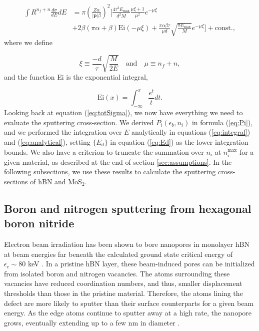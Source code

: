 \documentclass{article}
\begin{document}
\begin{equation}
  \begin{aligned}
    \int R^{n_f+n} \frac{d\sigma}{dE} dE
    &=
    \pi\left(\frac{Z\alpha}{|\mathbf{p}|\beta}\right)^2
    \bigg[
      \frac{4\tau^2 E_\text{max}}{d^2M} \frac{\mu\xi+1}{\mu^2} e^{-\mu\xi}
      \\&+
      2\beta(\pi\alpha+\beta)\text{Ei}(-\mu\xi)
      +
      \frac{\pi\alpha\beta\tau}{\mu d}\sqrt{\frac{8E_\text{max}}{M}}
      e^{-\mu\xi}
    \bigg]
    +\text{const}.,
  \end{aligned}
  \label{eq:analytical}
\end{equation}
%
where we define

\begin{equation}
  \xi \equiv \frac{-d}{\tau} \sqrt{\frac{M}{2E}}
  \quad\text{and}\quad
  \mu \equiv n_f + n,
  \label{eq:xi}
\end{equation}
%
and the function Ei is the exponential integral,

\begin{equation}
  \text{Ei}(x) = \int_{-\infty}^x \frac{e^t}{t}dt.
  \label{eq:Ei}
\end{equation}
%
Looking back at equation (\ref{eq:totSigma}), we now have everything we need to
evaluate the sputtering cross-section.
We derived $P_i(\epsilon_b, n_i)$ in formula (\ref{eq:Pi}), and we performed
the integration over $E$ analytically in equations (\ref{eq:integral}) and
(\ref{eq:analytical}), setting $\{E_d\}$ in equation (\ref{eq:Ed}) as the lower
integration bounds.
We also have a criterion to truncate the summation over $n_i$ at
$n_i^\text{max}$ for a given material, as described at the end of section
\ref{sec:assumptions}.
In the following subsections, we use these results to calculate the sputtering
cross-sections of hBN and MoS$_2$.


\subsection{Boron and nitrogen sputtering from hexagonal boron nitride}
\label{sec:hBN}

Electron beam irradiation has been shown to bore nanopores in monolayer hBN at
beam energies far beneath the calculated ground state critical energy of
$\epsilon_c\sim80$ keV \cite{Jin2009,Meyer2009,Kotakoski2010,Cretu2015}.
In a pristine hBN layer, these beam-induced pores can be initialized from
isolated boron and nitrogen vacancies.
The atoms surrounding these vacancies have reduced coordination numbers, and
thus, smaller displacement thresholds than those in the pristine material.
Therefore, the atoms lining the defect are more likely to sputter than their
surface counterparts for a given beam energy.
As the edge atoms continue to sputter away at a high rate, the nanopore grows,
eventually extending up to a few nm in diameter
\cite{Meyer2009,Cretu2015,Dogan2020}.
\end{document}
